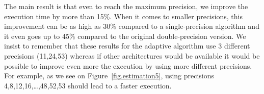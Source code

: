    The main result is that even to reach the maximum precision, we improve the execution time by more than 15\%. When it comes to smaller precisions, this improvement can be as high as 30\% compared to
   a single-precision algorithm and it even goes up to 45\% compared to the original double-precision version. We insist to remember that these results for the adaptive algorithm use 3 different precisions (11,24,53)
   whereas if other architectures would be available it would be possible to improve even more the execution by using more different precisions. For example, as we see on Figure~\ref{fig.estimation5}, using precisions
   4,8,12,16,\dots,48,52,53 should lead to a faster execution.

